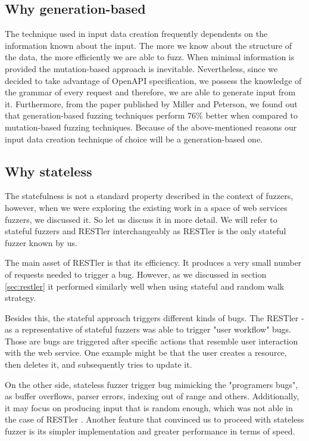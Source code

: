 \subsection{Why generation-based}
The technique used in input data creation frequently dependents on the information known about the input. The more we know about the structure of the data, the more efficiently we are able to fuzz. When minimal information is provided the mutation-based approach is inevitable. Nevertheless, since we decided to take advantage of OpenAPI specification, we possess the knowledge of the grammar of every request and therefore, we are able to generate input from it. Furthermore, from the paper published by Miller and Peterson, we found out that generation-based fuzzing techniques perform 76\% better when compared to mutation-based fuzzing techniques\cite{miller2007analysis}. Because of the above-mentioned reasons our input data creation technique of choice will be a generation-based one.

\subsection{Why stateless}
The statefulness is not a standard property described in the context of fuzzers, however, when we were exploring the existing work in a space of web services fuzzers, we discussed it. So let us discuss it in more detail. We will refer to stateful fuzzers and RESTler interchangeably as RESTler is the only stateful fuzzer known by us.

The main asset of RESTler is that its efficiency. It produces a very small number of requests needed to trigger a bug. However, as we discussed in section \ref{sec:restler} it performed similarly well when using stateful and random walk strategy.

Besides this, the stateful approach triggers different kinds of bugs. The RESTler - as a representative of stateful fuzzers was able to trigger "user workflow" bugs. Those are bugs are triggered after specific actions that resemble user interaction with the web service. One example might be that the user creates a resource, then deletes it, and subsequently tries to update it.

On the other side, stateless fuzzer trigger bug mimicking the "programers bugs", as buffer overflows, parser errors, indexing out of range and others. Additionally, it may focus on producing input that is random enough, which was not able in the case of RESTler \cite{atlidakis2019restler}. Another feature that convinced us to proceed with stateless fuzzer is its simpler implementation and greater performance in terms of speed.

